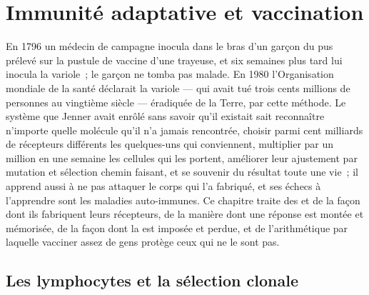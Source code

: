 \chapter{Immunité adaptative et vaccination}\label{ch:b3:adaptive-immunity}

En 1796 un médecin de campagne inocula dans le bras d'un garçon du pus
prélevé sur la pustule de vaccine d'une trayeuse, et six semaines plus
tard lui inocula la variole~; le garçon ne tomba pas malade. En 1980
l'Organisation mondiale de la santé déclarait la variole --- qui avait
tué trois cents millions de personnes au vingtième siècle --- éradiquée
de la Terre, par cette méthode. Le système que Jenner avait enrôlé sans
savoir qu'il existait sait reconnaître n'importe quelle molécule qu'il
n'a jamais rencontrée, choisir parmi cent milliards de récepteurs
différents les quelques-uns qui conviennent, multiplier par un million
en une semaine les cellules qui les portent, améliorer leur ajustement
par mutation et sélection chemin faisant, et se souvenir du résultat
toute une vie~; il apprend aussi à ne pas attaquer le corps qui l'a
fabriqué, et ses échecs à l'apprendre sont les maladies auto-immunes. Ce
chapitre traite des  et de la façon dont ils fabriquent leurs
récepteurs, de la manière dont une réponse est montée et mémorisée, de
la façon dont la  est imposée et perdue, et de l'arithmétique
par laquelle vacciner assez de gens protège ceux qui ne le sont pas.

\section{Les lymphocytes et la sélection clonale}

